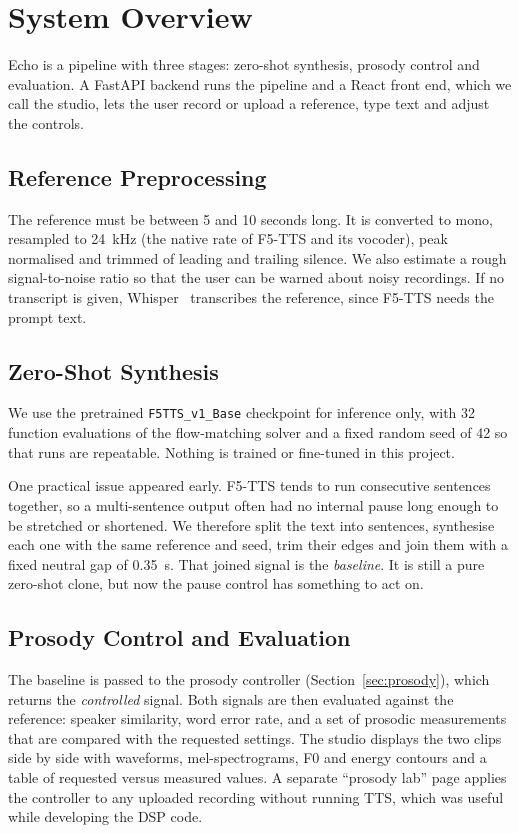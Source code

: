 \documentclass[conference]{IEEEtran}
\begin{document}
\section{System Overview}\label{sec:system}

Echo is a pipeline with three stages: zero-shot synthesis, prosody control and evaluation. A FastAPI
backend runs the pipeline and a React front end, which we call the studio, lets the user record or
upload a reference, type text and adjust the controls.

\subsection{Reference Preprocessing}
The reference must be between 5 and 10 seconds long. It is converted to mono, resampled to
24~kHz (the native rate of F5-TTS and its vocoder), peak normalised and trimmed of leading and trailing
silence. We also estimate a rough signal-to-noise ratio so that the user can be warned about noisy
recordings. If no transcript is given, Whisper~\cite{b16} transcribes the reference, since F5-TTS
needs the prompt text.

\subsection{Zero-Shot Synthesis}
We use the pretrained \texttt{F5TTS\_v1\_Base} checkpoint for inference only, with 32 function
evaluations of the flow-matching solver and a fixed random seed of 42 so that runs are repeatable.
Nothing is trained or fine-tuned in this project.

One practical issue appeared early. F5-TTS tends to run consecutive sentences together, so a
multi-sentence output often had no internal pause long enough to be stretched or shortened. We
therefore split the text into sentences, synthesise each one with the same reference and seed,
trim their edges and join them with a fixed neutral gap of 0.35~s. That joined signal is the
\emph{baseline}. It is still a pure zero-shot clone, but now the pause control has something to act on.

\subsection{Prosody Control and Evaluation}
The baseline is passed to the prosody controller (Section~\ref{sec:prosody}), which returns the
\emph{controlled} signal. Both signals are then evaluated against the reference: speaker similarity,
word error rate, and a set of prosodic measurements that are compared with the requested
settings. The studio displays the two clips side by side with waveforms, mel-spectrograms, F0 and
energy contours and a table of requested versus measured values. A separate ``prosody lab'' page
applies the controller to any uploaded recording without running TTS, which was useful while
developing the DSP code.
\end{document}
